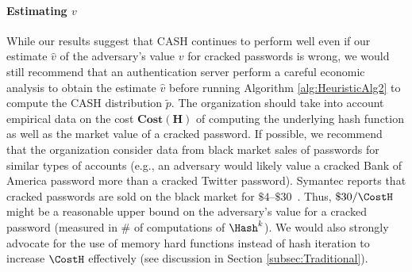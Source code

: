 \paragraph{Estimating $v$} While our results suggest that CASH continues to perform well even if our estimate $\hat{v}$ of the adversary's value $v$ for cracked passwords is wrong, we would still recommend that an authentication server perform a careful economic analysis to obtain the estimate $\hat{v}$ before running Algorithm \ref{alg:HeuristicAlg2} to compute the CASH distribution $\tilde{p}$. The organization should take into account empirical data on the cost $\mathbf{Cost}\left(\mathbf{H}\right)$ of computing the underlying hash function as well as the market value of a cracked password. If possible, we recommend that the organization consider data from black market sales of passwords for similar types of  accounts (e.g., an adversary would likely value a cracked Bank of America password more than a cracked Twitter password). Symantec reports that cracked passwords are sold on the black market for $\$4$--$\$30$~\cite{passwordBlackMarket}. Thus, $\$30/\CostH$ might be a reasonable upper bound on the adversary's value for a cracked password (measured in \# of computations of $\Hash^k$). We would also strongly advocate for the use of memory hard functions instead of hash iteration to increase $\CostH$ effectively (see discussion in Section \ref{subsec:Traditional}). 


